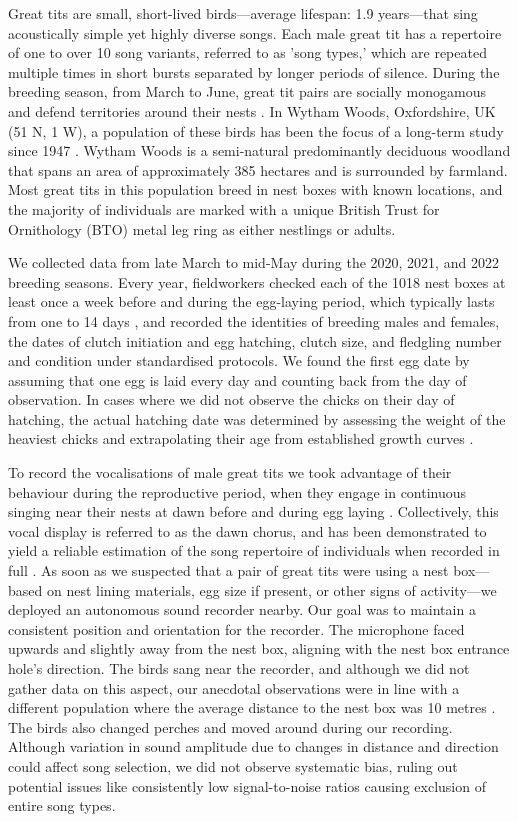 \documentclass[9pt, twocolumn, twoside]{gsajnl}
\begin{document}
Great tits are small, short-lived birds---average lifespan: 1.9 years---that sing acoustically simple yet highly diverse songs. Each male great tit has a repertoire of one to over 10 song variants, referred to as 'song types,' which are repeated multiple times in short bursts separated by longer periods of silence. During the breeding season, from March to June, great tit pairs are socially monogamous and defend territories around their nests \parencite{hinde1952}. In Wytham Woods, Oxfordshire, UK (51 N, 1 W), a population of these birds has been the focus of a long-term study since 1947 \parencite{lack1964}. Wytham Woods is a semi-natural predominantly deciduous woodland that spans an area of approximately 385 hectares and is surrounded by farmland. Most great tits in this population breed in nest boxes with known locations, and the majority of individuals are marked with a unique British Trust for Ornithology (BTO) metal leg ring as either nestlings or adults.

We collected data from late March to mid-May during the 2020, 2021, and 2022 breeding seasons. Every year, fieldworkers checked each of the 1018 nest boxes at least once a week before and during the egg-laying period, which typically lasts from one to 14 days \parencite{Perrins1965}, and recorded the identities of breeding males and females, the dates of clutch initiation and egg hatching, clutch size, and fledgling number and condition under standardised protocols. We found the first egg date by assuming that one egg is laid every day and counting back from the day of observation. In cases where we did not observe the chicks on their day of hatching, the actual hatching date was determined by assessing the weight of the heaviest chicks and extrapolating their age from established growth curves \parencite{cresswell2003, gibb1950}.

To record the vocalisations of male great tits we took advantage of their behaviour during the reproductive period, when they engage in continuous singing near their nests at dawn before and during egg laying \parencite{mace1987}. Collectively, this vocal display is referred to as the dawn chorus, and has been demonstrated to yield a reliable estimation of the song repertoire of individuals when recorded in full \parencite{rivera-gutierrez2012, vanduyse2005}. As soon as we suspected that a pair of great tits were using a nest box---based on nest lining materials, egg size if present, or other signs of activity---we deployed an autonomous sound recorder nearby. Our goal was to maintain a consistent position and orientation for the recorder. The microphone faced upwards and slightly away from the nest box, aligning with the nest box entrance hole's direction. The birds sang near the recorder, and although we did not gather data on this aspect, our anecdotal observations were in line with a different population where the average distance to the nest box was 10 metres \parencite{halfwerk2012}. The birds also changed perches and moved around during our recording. Although variation in sound amplitude due to changes in distance and direction could affect song selection, we did not observe systematic bias, ruling out potential issues like consistently low signal-to-noise ratios causing exclusion of entire song types.
\end{document}
